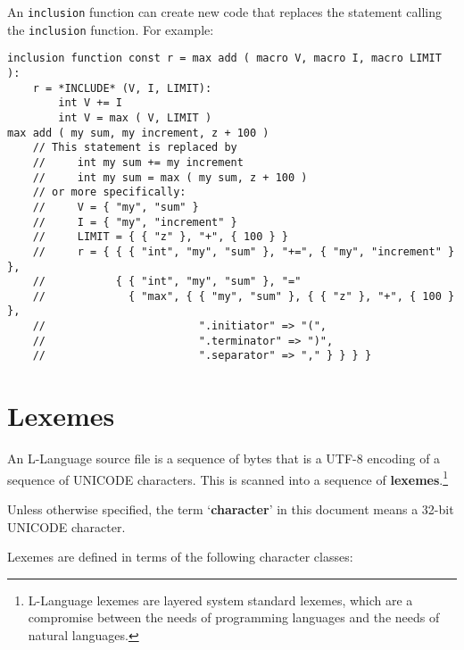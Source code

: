 \documentclass[12pt]{article}
\newcommand{\key}[1]{{\rm \bfseries #1}}
\newcommand{\skey}[2]{{\rm \bfseries #1#2}}
\newenvironment{indpar}[1][0.3in]%
	{\begin{list}{}%
		     {\setlength{\itemsep}{0in}%
		      \setlength{\topsep}{0in}%
		      \setlength{\parsep}{1ex}%
		      \setlength{\labelwidth}{#1}%
		      \setlength{\leftmargin}{#1}%
		      \addtolength{\leftmargin}{\labelsep}}%
	 \item}%
	{\end{list}}
\begin{document}
An {\tt inclusion} function can create new code that replaces
the statement calling the {\tt inclu\-sion} function.  For example:
\begin{indpar}[0.1in]\begin{verbatim}
inclusion function const r = max add ( macro V, macro I, macro LIMIT ):
    r = *INCLUDE* (V, I, LIMIT):
        int V += I
        int V = max ( V, LIMIT )
max add ( my sum, my increment, z + 100 )
    // This statement is replaced by
    //     int my sum += my increment
    //     int my sum = max ( my sum, z + 100 )
    // or more specifically:
    //     V = { "my", "sum" }
    //     I = { "my", "increment" }
    //     LIMIT = { { "z" }, "+", { 100 } }
    //     r = { { { "int", "my", "sum" }, "+=", { "my", "increment" } },
    //           { { "int", "my", "sum" }, "="
    //             { "max", { { "my", "sum" }, { { "z" }, "+", { 100 } },
    //                        ".initiator" => "(",
    //                        ".terminator" => ")",
    //                        ".separator" => "," } } } }
\end{verbatim}\end{indpar}

\section{Lexemes}
\label{LEXEMES}

An L-Language source file is a sequence of bytes that is a UTF-8 encoding
of a sequence of UNICODE characters.  This is scanned into a sequence
of \skey{lexeme}s.\footnote{
L-Language lexemes are layered system standard
lexemes, which are a compromise between the needs of programming languages
and the needs of natural languages.}

Unless otherwise specified, the term `\key{character}' in this
document means a 32-bit UNICODE character.

Lexemes are defined in terms of
the following character classes:
\end{document}
